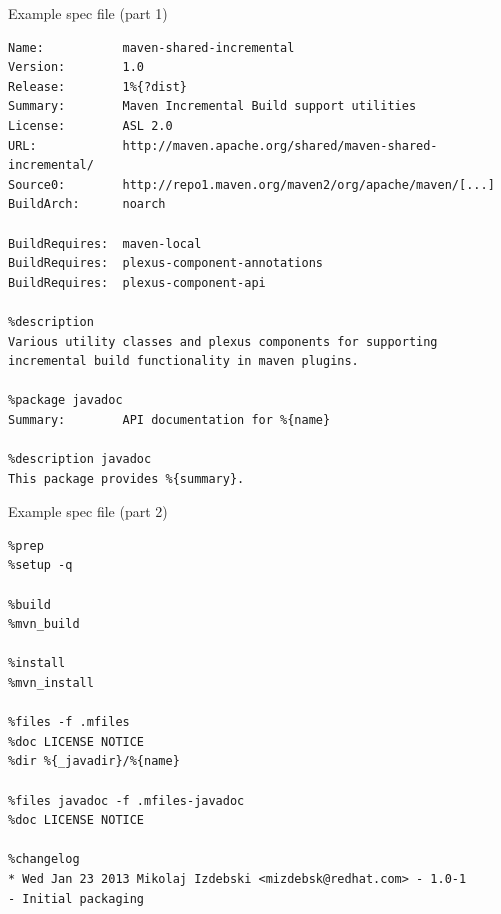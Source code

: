 \documentclass[pdftex,unicode,xcolor=table]{beamer}
\begin{document}
\begin{frame}[fragile]
  \begin{block}{Example spec file (part 1)}
    \scriptsize
\begin{verbatim}
Name:           maven-shared-incremental
Version:        1.0
Release:        1%{?dist}
Summary:        Maven Incremental Build support utilities
License:        ASL 2.0
URL:            http://maven.apache.org/shared/maven-shared-incremental/
Source0:        http://repo1.maven.org/maven2/org/apache/maven/[...]
BuildArch:      noarch

BuildRequires:  maven-local
BuildRequires:  plexus-component-annotations
BuildRequires:  plexus-component-api

%description
Various utility classes and plexus components for supporting
incremental build functionality in maven plugins.

%package javadoc
Summary:        API documentation for %{name}

%description javadoc
This package provides %{summary}.
\end{verbatim}
  \end{block}
\end{frame}


\begin{frame}[fragile]
  \begin{block}{Example spec file (part 2)}
    \scriptsize
\begin{verbatim}
%prep
%setup -q

%build
%mvn_build

%install
%mvn_install

%files -f .mfiles
%doc LICENSE NOTICE
%dir %{_javadir}/%{name}

%files javadoc -f .mfiles-javadoc
%doc LICENSE NOTICE

%changelog
* Wed Jan 23 2013 Mikolaj Izdebski <mizdebsk@redhat.com> - 1.0-1
- Initial packaging



\end{verbatim}
  \end{block}
\end{frame}
\end{document}
